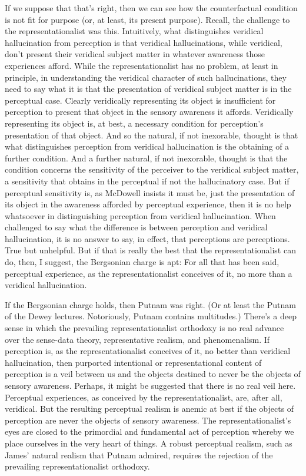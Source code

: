 \documentclass[12pt]{article}
\begin{document}
If we suppose that that's right, then we can see how the counterfactual condition is not fit for purpose (or, at least, its present purpose). Recall, the challenge to the representationalist was this. Intuitively, what distinguishes veridical hallucination from perception is that veridical hallucinations, while veridical, don't present their veridical subject matter in whatever awareness those experiences afford. While the representationalist has no problem, at least in principle, in understanding the veridical character of such hallucinations, they need to say what it is that the presentation of veridical subject matter is in the perceptual case. Clearly veridically representing its object is insufficient for perception to present that object in the sensory awareness it affords. Veridically representing its object is, at best, a necessary condition for perception's presentation of that object. And so the natural, if not inexorable, thought is that what distinguishes perception from veridical hallucination is the obtaining of a further condition. And a further natural, if not inexorable, thought is that the condition concerns the sensitivity of the perceiver to the veridical subject matter, a sensitivity that obtains in the perceptual if not the hallucinatory case. But if perceptual sensitivity is, as McDowell insists it must be, just the presentation of its object in the awareness afforded by perceptual experience, then it is no help whatsoever in distinguishing perception from veridical hallucination. When challenged to say what the difference is between perception and veridical hallucination, it is no answer to say, in effect, that perceptions are perceptions. True but unhelpful. But if that is really the best that the representationalist can do, then, I suggest, the Bergsonian charge is apt: For all that has been said, perceptual experience, as the representationalist conceives of it, no more than a veridical hallucination.

If the Bergsonian charge holds, then Putnam was right. (Or at least the Putnam of the Dewey lectures. Notoriously, Putnam contains multitudes.) There's a deep sense in which the prevailing representationalist orthodoxy is no real advance over the sense-data theory, representative realism, and phenomenalism. If perception is, as the representationalist conceives of it, no better than veridical hallucination, then purported intentional or representational content of perception is a veil between us and the objects destined to never be the objects of sensory awareness. Perhaps, it might be suggested that there is no real veil here. Perceptual experiences, as conceived by the representationalist, are, after all, veridical. But the resulting perceptual realism is anemic at best if the objects of perception are never the objects of sensory awareness. The representationalist's eyes are closed to the primordial and fundamental act of perception whereby we place ourselves in the very heart of things. A robust perceptual realism, such as James' natural realism that Putnam admired, requires the rejection of the prevailing representationalist orthodoxy.






\end{document}
